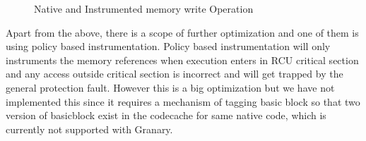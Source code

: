 \begin{figure}[ht!]
%

\caption{Native and Instrumented memory write Operation\label{fig:mem-write}}
\vspace{-1em}
\end{figure}

Apart from the above, there is a scope of further optimization and one of them is using policy based instrumentation. Policy based instrumentation will only instruments the memory references when execution enters in RCU critical section and any access outside critical section is incorrect and will get trapped by the general protection fault. However this is a big optimization but we have not implemented this since it requires a mechanism of tagging basic block so that two version of basicblock exist in the codecache for same native code, which is currently not supported with Granary.


